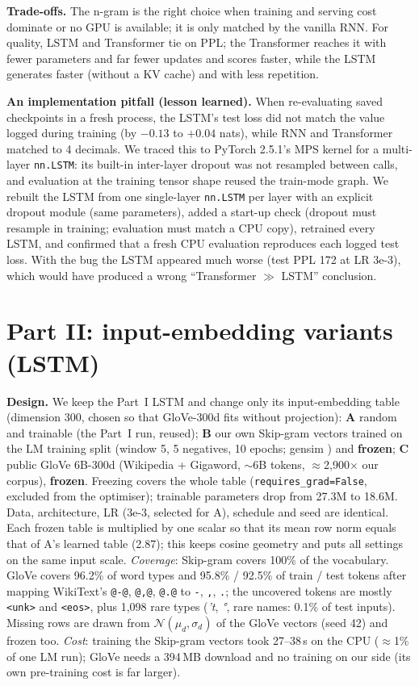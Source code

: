 \documentclass[10pt,a4paper]{article}
\begin{document}
\textbf{Trade-offs.} The n-gram is the right choice when training and serving cost dominate or no GPU is
available; it is only matched by the vanilla RNN. For quality, LSTM and Transformer tie on PPL; the
Transformer reaches it with fewer parameters and far fewer updates and scores faster, while the LSTM generates
faster (without a KV cache) and with less repetition.

\textbf{An implementation pitfall (lesson learned).} When re-evaluating saved checkpoints in a fresh
process, the LSTM's test loss did not match the value logged during training (by $-0.13$ to $+0.04$ nats),
while RNN and Transformer matched to 4 decimals. We traced this to PyTorch 2.5.1's MPS kernel for a multi-layer
\texttt{nn.LSTM}: its built-in inter-layer dropout was not resampled between calls, and evaluation at the
training tensor shape reused the train-mode graph. We rebuilt the LSTM from one single-layer \texttt{nn.LSTM}
per layer with an explicit dropout module (same parameters), added a start-up check (dropout must resample in
training; evaluation must match a CPU copy), retrained every LSTM, and confirmed that a fresh CPU evaluation
reproduces each logged test loss. With the bug the LSTM appeared much worse (test PPL 172 at LR 3e-3), which
would have produced a wrong ``Transformer $\gg$ LSTM'' conclusion.

\section{Part II: input-embedding variants (LSTM)}
\textbf{Design.} We keep the Part~I LSTM and change only its input-embedding table (dimension 300, chosen so
that GloVe-300d fits without projection): \textbf{A} random and trainable (the Part~I run, reused);
\textbf{B} our own Skip-gram \citep{mikolov2013} vectors trained on the LM training split (window 5, 5
negatives, 10 epochs; gensim \citep{rehurek2010}) and \textbf{frozen}; \textbf{C} public GloVe 6B-300d
\citep{pennington2014} (Wikipedia + Gigaword, $\sim$6B tokens, $\approx$2,900$\times$ our corpus),
\textbf{frozen}. Freezing covers the whole table (\texttt{requires\_grad=False}, excluded from the
optimiser); trainable parameters drop from 27.3M to 18.6M. Data, architecture, LR (3e-3, selected for A),
schedule and seed are identical. Each frozen table is multiplied by one scalar so that its mean row norm
equals that of A's learned table (2.87); this keeps cosine geometry and puts all settings on the same input
scale. \emph{Coverage}: Skip-gram covers 100\% of the vocabulary. GloVe covers 96.2\% of word types and
95.8\% / 92.5\% of train / test tokens after mapping WikiText's \texttt{@-@}, \texttt{@,@}, \texttt{@.@} to
\texttt{-}, \texttt{,}, \texttt{.}; the uncovered tokens are mostly \texttt{<unk>} and \texttt{<eos>}, plus
1,098 rare types (\emph{'t}, \emph{°}, rare names: 0.1\% of test inputs). Missing rows are drawn from
$\mathcal{N}(\mu_d,\sigma_d)$ of the GloVe vectors (seed 42) and frozen too. \emph{Cost}: training the
Skip-gram vectors took 27--38\,s on the CPU ($\approx$1\% of one LM run); GloVe needs a 394\,MB download and no
training on our side (its own pre-training cost is far larger).
\end{document}
